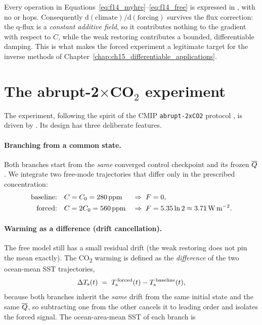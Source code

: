 \begin{remark}
Every operation in Equations~\eqref{eq:f14_myhre}--\eqref{eq:f14_free} is
expressed in , with no  or  hops. Consequently
$\mathrm{d}(\text{climate})/\mathrm{d}(\text{forcing})$ survives the flux
correction: the q-flux is a \emph{constant additive field}, so it contributes
nothing to the gradient with respect to $C$, while the weak restoring contributes
a bounded, differentiable damping. This is what makes the forced experiment a
legitimate target for the inverse methods of
Chapter~\ref{chap:ch15_differentiable_applications}.
\end{remark}

\section{The abrupt-2\texorpdfstring{$\times$}{x}CO\texorpdfstring{$_2$}{2} experiment}\label{sec:f14_experiment}

The experiment, following the spirit of the CMIP \texttt{abrupt-2xCO2} protocol
\citep{eyring2016cmip6}, is driven by . Its design has three deliberate features.

\paragraph{Branching from a common state.} Both branches start from the
\emph{same} converged control checkpoint and its frozen $\overline{Q}$. We integrate
two free-mode trajectories that differ only in the prescribed concentration:
\begin{align}
  \text{baseline:} \quad & C = C_0 = 280\,\mathrm{ppm}
    &&\Rightarrow\; F = 0, \label{eq:f14_base}\\
  \text{forced:} \quad & C = 2C_0 = 560\,\mathrm{ppm}
    &&\Rightarrow\; F = 5.35\ln 2 \approx 3.71\,\mathrm{W\,m^{-2}}.
    \label{eq:f14_forced}
\end{align}

\paragraph{Warming as a difference (drift cancellation).} The free model still
has a small residual drift (the weak restoring does not pin the mean exactly).
The CO\textsubscript{2} warming is defined as the \emph{difference} of the two
ocean-mean SST trajectories,
\begin{equation}
  \Delta T_{\mathrm{s}}(t) \;=\; T_{\mathrm{s}}^{\,\mathrm{forced}}(t) - T_{\mathrm{s}}^{\,\mathrm{baseline}}(t),
  \label{eq:f14_dSST}
\end{equation}
because both branches inherit the \emph{same} drift from the same initial state
and the same $\overline{Q}$, so subtracting one from the other cancels it to leading
order and isolates the forced signal. The ocean-area-mean SST of each branch is

